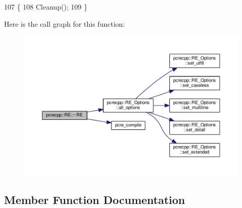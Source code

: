 \begin{DoxyCode}
107         \{
108   Cleanup();
109 \}
\end{DoxyCode}


Here is the call graph for this function\+:
\nopagebreak
\begin{figure}[H]
\begin{center}
\leavevmode
\includegraphics[width=350pt]{classpcrecpp_1_1RE_afa33d2d61abc56fc599d35f4c7f359c9_cgraph}
\end{center}
\end{figure}




\subsection{Member Function Documentation}
